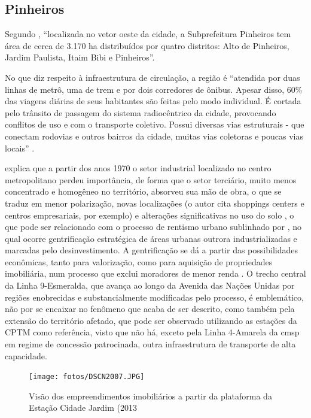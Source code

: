 	\subsection{Pinheiros} \label{Pinheiros}
	
	Segundo , ``localizada no vetor oeste da cidade, a Subprefeitura Pinheiros tem área de cerca de 3.170 ha distribuídos por quatro distritos: Alto de Pinheiros, Jardim Paulista, Itaim Bibi e Pinheiros''.
	
	No que diz respeito à infraestrutura de circulação, a região é ``atendida por duas linhas de metrô, uma de trem e por dois corredores de ônibus. Apesar disso, 60\% das viagens diárias de seus habitantes são feitas pelo modo individual. É cortada pelo trânsito de passagem do sistema radiocêntrico da cidade, provocando conflitos de uso e com o transporte coletivo. Possui diversas vias estruturais - que conectam rodovias e outros bairros da cidade, muitas vias coletoras e poucas vias locais'' \cite[pág. 147]{planocentro}.

	 explica que a partir dos anos 1970 o setor industrial localizado no centro metropolitano perdeu importância, de forma que o setor terciário, muito menos concentrado e homogêneo no território, absorveu sua mão de obra, o que se traduz em menor polarização, novas localizações (o autor cita shoppings centers e centros empresariais, por exemplo) e alterações significativas no uso do solo , o que pode ser relacionado com o processo de rentismo urbano sublinhado por , no qual ocorre gentrificação estratégica de áreas urbanas outrora industrializadas e marcadas pelo desinvestimento. A gentrificação se dá a partir das possibilidades econômicas, tanto para valorização, como para aquisição de propriedades imobiliária, num processo que exclui moradores de menor renda . O trecho central da Linha 9-Esmeralda, que avança ao longo da Avenida das Nações Unidas por regiões enobrecidas e substancialmente modificadas pelo processo, é emblemático, não por se encaixar no fenômeno que acaba de ser descrito, como também pela extensão do território afetado, que pode ser observado utilizando as estações da CPTM como referência, visto que não há, exceto pela Linha 4-Amarela da \gls{cmsp} em regime de concessão patrocinada, outra infraestrutura de transporte de alta capacidade.
	
	\begin{figure}[h]
		\caption{Visão dos empreendimentos imobiliários a partir da plataforma da Estação Cidade Jardim (2013}
		\texttt{[image: fotos/DSCN2007.JPG]}
	\end{figure}
	
